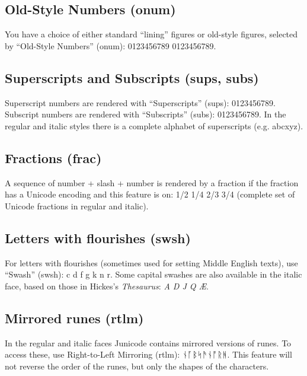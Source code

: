 \documentclass[12pt,a4paper,openany]{book}
\begin{document}
\subsection*{Old-Style Numbers (onum)}

You have a choice of either standard “lining” figures or old-style
figures, selected by “Old-Style Numbers” (onum): 0123456789
{0123456789.}

\subsection*{Superscripts and Subscripts (sups, subs)}

\noindent Superscript numbers are rendered with “Superscripts” (sups):
{ 0123456789}.  Subscript numbers
are rendered with “Subscripts” (subs):
{ 0123456789}. In the regular and
italic styles there is a complete alphabet of superscripts (e.g.
{abcxyz}).

\subsection*{Fractions (frac)}

A sequence of number + slash + number is rendered by a fraction if the
fraction has a Unicode encoding and this feature is on:
{ 1/2 1/4 2/3 3/4} (complete set of Unicode
fractions in regular and italic).

\subsection*{Letters with flourishes (swsh)}
For letters with flourishes (sometimes used for setting Middle English
texts), use “Swash” (swsh):
{c d f g k n r}. Some capital swashes are also
available in the italic face, based on those in Hickes's \textit{Thesaurus}:
{\textit{A D J Q Æ}}.

\subsection*{Mirrored runes (rtlm)}

In the regular and italic faces Junicode
contains mirrored versions of runes. To access these, use
Right-to-Left Mirroring (rtlm): {
  ᚾᚪᛒᛋᚫᚾᚩᚱᚻ.} This feature will not reverse the order of the runes,
but only the shapes of the characters.
\end{document}
